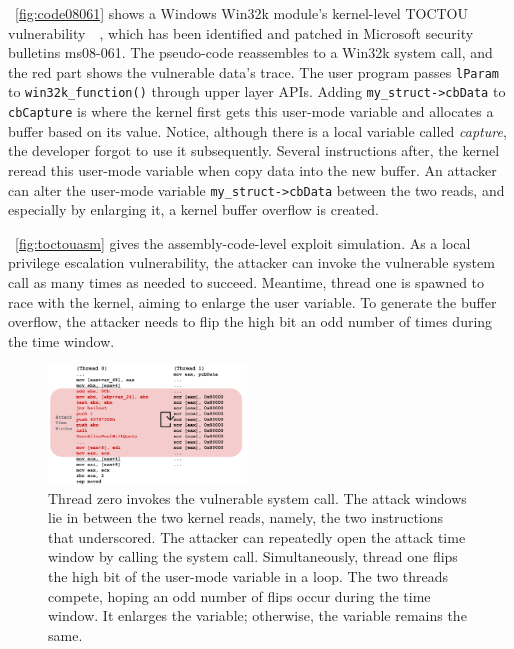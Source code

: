 ~\autoref{fig:code08061} shows a Windows Win32k module's kernel-level TOCTOU vulnerability~\cite{jurczyk2013identifying}~\cite{ms08061}, which has been identified and patched in Microsoft security bulletins ms08-061. The pseudo-code reassembles to a Win32k system call, and the red part shows the vulnerable data's trace.  The user program passes \texttt{lParam} to \texttt{win32k\_function()} through upper layer APIs.  Adding \texttt{my\_struct->cbData} to \texttt{cbCapture} is where the kernel first gets this user-mode variable and allocates a buffer based on its value. Notice, although there is a local variable called \textit{capture}, the developer forgot to use it subsequently.  Several instructions after, the kernel reread this user-mode variable when copy data into the new buffer.  An attacker can alter the user-mode variable \texttt{my\_struct->cbData} between the two reads, and especially by enlarging it, a kernel buffer overflow is created.


~\autoref{fig:toctouasm} gives the assembly-code-level exploit simulation.  As a local privilege escalation vulnerability, the attacker can invoke the vulnerable system call as many times as needed to succeed. Meantime, thread one is spawned to race with the kernel, aiming to enlarge the user variable. To generate the buffer overflow, the attacker needs to flip the high bit an odd number of times during the time window.


\begin{figure}[ht]
  \includegraphics[width=0.47\textwidth]{figures/toctouasm3}
  \centering
  \caption{Thread zero invokes the vulnerable system call. The attack windows lie in between the two kernel reads, namely, the two instructions that underscored. The attacker can repeatedly open the attack time window by calling the system call. Simultaneously, thread one flips the high bit of the user-mode variable in a loop. The two threads compete, hoping an odd number of flips occur during the time window. It enlarges the variable; otherwise, the variable remains the same.}
  \label{fig:toctouasm}
\end{figure}



